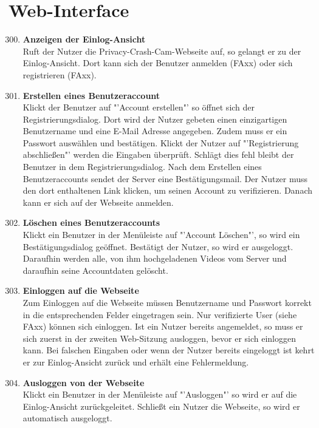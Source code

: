 \section{Web-Interface}
\begin{enumerate}[\bfseries{FA}10]
\setcounter{enumi}{299}
\item \textbf{Anzeigen der Einlog-Ansicht} \hfill \\
Ruft der Nutzer die Privacy-Crash-Cam-Webseite auf, so gelangt er zu der Einlog-Ansicht. Dort kann sich der Benutzer anmelden (FAxx) oder sich registrieren (FAxx).

\item \textbf{Erstellen eines Benutzeraccount} \hfill \\
Klickt der Benutzer auf "'Account erstellen"' so öffnet sich der Registrierungsdialog. Dort wird der Nutzer gebeten einen einzigartigen Benutzername und eine E-Mail Adresse angegeben. Zudem muss er ein Passwort auswählen und bestätigen. Klickt der Nutzer auf "'Registrierung abschließen"' werden die Eingaben überprüft. Schlägt dies fehl bleibt der Benutzer in dem Registrierungsdialog. Nach dem Erstellen eines Benutzeraccounts sendet der Server eine Bestätigungsmail. Der Nutzer muss den dort enthaltenen Link klicken, um seinen Account zu verifizieren. Danach kann er sich auf der Webseite anmelden.

\item \textbf{Löschen eines Benutzeraccounts} \hfill \\
Klickt ein Benutzer in der Menüleiste auf "'Account Löschen"', so wird ein Bestätigungsdialog geöffnet. Bestätigt der Nutzer, so wird er ausgeloggt. Daraufhin werden alle, von ihm hochgeladenen Videos vom Server und daraufhin seine Accountdaten gelöscht.

\item \textbf{Einloggen auf die Webseite} \hfill \\
Zum Einloggen auf die Webseite müssen Benutzername und Passwort korrekt in die entsprechenden Felder eingetragen sein. Nur verifizierte User (siehe FAxx) können sich einloggen. Ist ein Nutzer bereits angemeldet, so muss er sich zuerst in der zweiten Web-Sitzung ausloggen, bevor er sich einloggen kann. Bei falschen Eingaben oder wenn der Nutzer bereits eingeloggt ist kehrt er zur Einlog-Ansicht zurück und erhält eine Fehlermeldung.

\item \textbf{Ausloggen von der Webseite} \hfill \\
Klickt ein Benutzer in der Menüleiste auf "'Ausloggen"' so wird er auf die Einlog-Ansicht zurückgeleitet. Schließt ein Nutzer die Webseite, so wird er automatisch ausgeloggt.


\end{enumerate}
